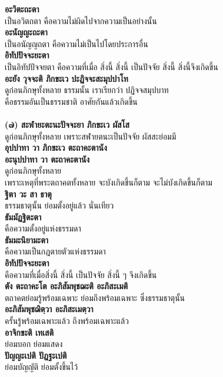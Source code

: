 \documentclass[12pt]{article}
\begin{document}
\textbf{อะวิตะถะตา}\\
\indent เป็นอวิตถตา คือความไม่ผิดไปจากความเป็นอย่างนั้น\\
\textbf{อะนัญญะถะตา}\\
\indent เป็นอนัญญถตา คือความไม่เป็นไปโดยประการอื่น\\
\textbf{อิทัปปัจจะยะตา}\\
\indent เป็นอิทัปปัจจยตา คือความที่เมื่อ สิ่งนี้ สิ่งนี้ เป็นปัจจัย สิ่งนี้ สิ่งนี้จึงเกิดขึ้น\\
\textbf{อะยัง วุจจะติ ภิกขะเว ปะฏิจจะสะมุปปาโท}\\
\indent ดูก่อนภิกษุทั้งหลาย ธรรมนั้น เราเรียกว่า ปฏิจจสมุปบาท \\
\indent คือธรรมอันเป็นธรรมชาติ อาศัยกันแล้วเกิดขึ้น\\
\\
\textbf{(๗) สะฬายะตะนะปัจจะยา ภิกขะเว ผัสโส}\\
\indent ดูก่อนภิกษุทั้งหลาย เพราะสฬายตนะเป็นปัจจัย ผัสสะย่อมมี\\
\textbf{อุปปาทา วา ภิกขะเว ตะถาคะตานัง\\
อะนุปปาทา วา ตะถาคะตานัง}\\
\indent ดูก่อนภิกษุทั้งหลาย\\
\indent เพราะเหตุที่พระตถาคตทั้งหลาย จะบังเกิดขึ้นก็ตาม จะไม่บังเกิดขึ้นก็ตาม\\
\textbf{ฐิตา วะ สา ธาตุ}\\
\indent ธรรมธาตุนั้น ย่อมตั้งอยู่แล้ว นั่นเทียว\\
\textbf{ธัมมัฏฐิตะตา}\\
\indent คือความตั้งอยู่แห่งธรรมดา\\
\textbf{ธัมมะนิยามะตา}\\
\indent คือความเป็นกฎตายตัวแห่งธรรมดา\\
\textbf{อิทัปปัจจะยะตา}\\
\indent คือความที่เมื่อสิ่งนี้ สิ่งนี้ เป็นปัจจัย สิ่งนี้ ๆ จึงเกิดขึ้น\\
\textbf{ตัง ตะถาคะโต อะภิสัมพุชฌะติ อะภิสะเมติ}\\
\indent ตถาคตย่อมรู้พร้อมเฉพาะ ย่อมถึงพร้อมเฉพาะ ซึ่งธรรมธาตุนั้น\\
\textbf{อะภิสัมพุชฌิตฺวา อะภิสะเมตฺวา}\\
\indent ครั้นรู้พร้อมเฉพาะแล้ว ถึงพร้อมเฉพาะแล้ว\\
\textbf{อาจิกขะติ เทเสติ}\\
\indent ย่อมบอก ย่อมแสดง\\
\textbf{ปัญญะเปติ ปัฏฐะเปติ}\\
\indent ย่อมบัญญัติ ย่อมตั้งขึ้นไว้\\
\end{document}
